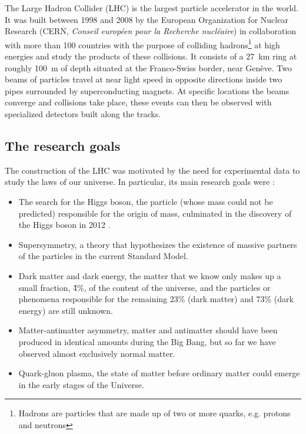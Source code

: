 The Large Hadron Collider (LHC) is the largest particle accelerator in the world. It was built between 1998 and 2008 by the European Organization for Nuclear Research (CERN, \textit{Conseil européen pour la Recherche nucléaire}) in collaboration with more than 100 countries with the purpose of colliding hadrons\footnote{\label{footnote:hadrons}Hadrons are particles that are made up of two or more quarks, e.g. protons and neutrons} at high energies and study the products of these collisions. It consists of a \qty{27}{\kilo\meter} ring at roughly \qty{100}{\meter} of depth situated at the Franco-Swiss border, near Genève. Two beams of particles travel at near light speed in opposite directions inside two pipes surrounded by superconducting magnets. At specific locations the beams converge and collisions take place, these events can then be observed with specialized detectors built along the tracks.


\subsection{The research goals}%

The construction of the LHC was motivated by the need for experimental data to study the laws of our universe. In particular, its main research goals were \cite{homeFactsFigures}:
\begin{itemize}
    \item The search for the Higgs boson, the particle (whose mass could not be predicted) responsible for the origin of mass, culminated in the discovery of the Higgs boson in 2012 \cite{20121}. 
    \item Supersymmetry, a theory that hypothesizes the existence of massive partners of the particles in the current Standard Model.
    \item Dark matter and dark energy, the matter that we know only makes up a small fraction, \~4\%, of the content of the universe, and the particles or phenomena responsible for the remaining 23\% (dark matter) and 73\% (dark energy) are still unknown.
    \item Matter-antimatter asymmetry, matter and antimatter should have been produced in identical amounts during the Big Bang, but so far we have observed almost exclusively normal matter.
    \item Quark-gluon plasma, the state of matter before ordinary matter could emerge in the early stages of the Universe.
\end{itemize}

